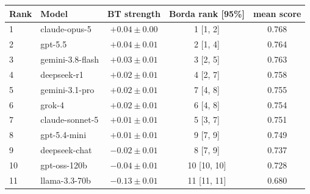 \begin{tabular}{llccc}
\toprule
Rank & Model & BT strength & Borda rank [95\%] & mean score \\
\midrule
1 & claude-opus-5 & $+0.04 \pm 0.00$ & 1 [1, 2] & 0.768 \\
2 & gpt-5.5 & $+0.04 \pm 0.01$ & 2 [1, 4] & 0.764 \\
3 & gemini-3.8-flash & $+0.03 \pm 0.01$ & 3 [2, 5] & 0.763 \\
4 & deepseek-r1 & $+0.02 \pm 0.01$ & 4 [2, 7] & 0.758 \\
5 & gemini-3.1-pro & $+0.02 \pm 0.01$ & 7 [4, 8] & 0.755 \\
6 & grok-4 & $+0.02 \pm 0.01$ & 6 [4, 8] & 0.754 \\
7 & claude-sonnet-5 & $+0.01 \pm 0.01$ & 5 [3, 7] & 0.751 \\
8 & gpt-5.4-mini & $+0.01 \pm 0.01$ & 9 [7, 9] & 0.749 \\
9 & deepseek-chat & $-0.02 \pm 0.01$ & 8 [7, 9] & 0.737 \\
10 & gpt-oss-120b & $-0.04 \pm 0.01$ & 10 [10, 10] & 0.728 \\
11 & llama-3.3-70b & $-0.13 \pm 0.01$ & 11 [11, 11] & 0.680 \\
\bottomrule
\end{tabular}
